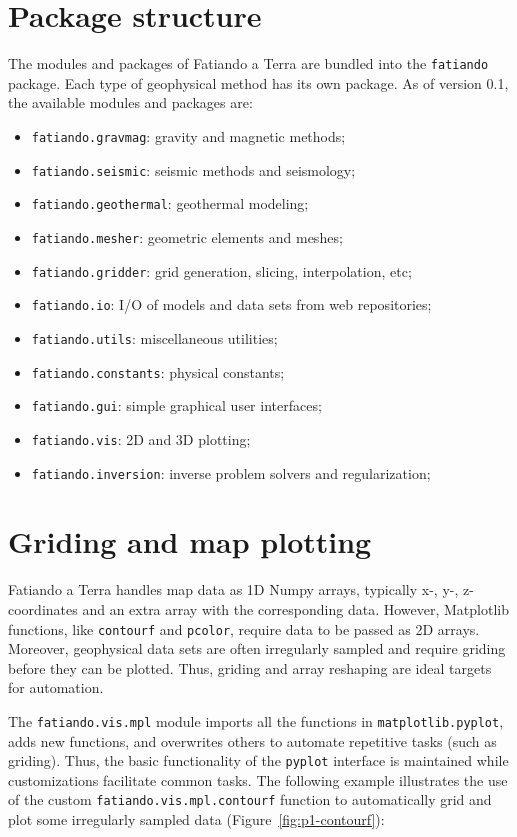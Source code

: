 \section{Package structure}

The modules and packages of Fatiando a Terra are bundled into the
\texttt{fatiando} package. Each type of geophysical method has its own
package. As of version 0.1, the available modules and packages are:

\begin{itemize}
\item
  \texttt{fatiando.gravmag}: gravity and magnetic methods;
\item
  \texttt{fatiando.seismic}: seismic methods and seismology;
\item
  \texttt{fatiando.geothermal}: geothermal modeling;
\item
  \texttt{fatiando.mesher}: geometric elements and meshes;
\item
  \texttt{fatiando.gridder}: grid generation, slicing, interpolation,
  etc;
\item
  \texttt{fatiando.io}: I/O of models and data sets from web
  repositories;
\item
  \texttt{fatiando.utils}: miscellaneous utilities;
\item
  \texttt{fatiando.constants}: physical constants;
\item
  \texttt{fatiando.gui}: simple graphical user interfaces;
\item
  \texttt{fatiando.vis}: 2D and 3D plotting;
\item
  \texttt{fatiando.inversion}: inverse problem solvers and
  regularization;
\end{itemize}

\section{Griding and map plotting}

Fatiando a Terra handles map data as 1D Numpy arrays, typically x-, y-,
z-coordinates and an extra array with the corresponding data. However,
Matplotlib functions, like \texttt{contourf} and \texttt{pcolor},
require data to be passed as 2D arrays. Moreover, geophysical data sets
are often irregularly sampled and require griding before they can be
plotted. Thus, griding and array reshaping are ideal targets for
automation.

The \texttt{fatiando.vis.mpl} module imports all the functions in
\texttt{matplotlib.pyplot}, adds new functions, and overwrites others to
automate repetitive tasks (such as griding). Thus, the basic
functionality of the \texttt{pyplot} interface is maintained while
customizations facilitate common tasks. The following example
illustrates the use of the custom \texttt{fatiando.vis.mpl.contourf}
function to automatically grid and plot some irregularly sampled data
(Figure~\ref{fig:p1-contourf}):

